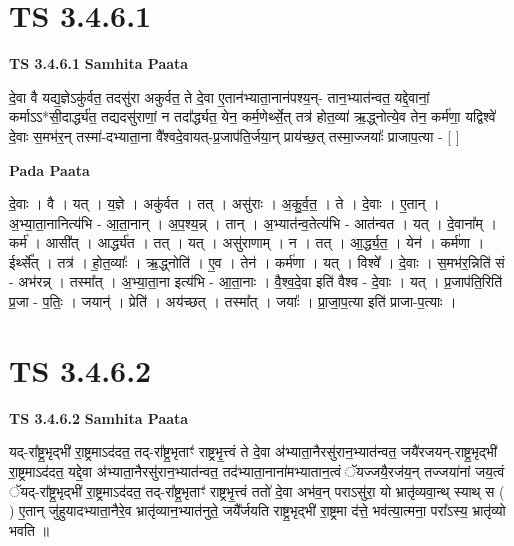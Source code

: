 \documentclass[17pt]{extarticle}
\begin{document}

\section{ TS 3.4.6.1 }

\textbf{TS 3.4.6.1 } \newline
\textbf{Samhita Paata} \newline

दे॒वा वै यद्य॒ज्ञेऽकु॑र्वत॒ तदसु॑रा अकुर्वत॒ ते दे॒वा ए॒तान॑भ्याता॒नान॑पश्य॒न्- तान॒भ्यात॑न्वत॒ यद्दे॒वानां॒ कर्माऽऽ*सी॒दार्द्ध्य॑त॒ तद्यदसु॑राणां॒ न तदा᳚र्द्ध्यत॒ येन॒ कर्म॒णेर्थ्से॒त् तत्र॑ होत॒व्या॑ ऋ॒द्ध्नोत्ये॒व तेन॒ कर्म॑णा॒ यद्विश्वे॑ दे॒वाः स॒मभ॑र॒न् तस्मा॑-दभ्याता॒ना वै᳚श्वदे॒वायत्-प्र॒जाप॑ति॒र्जया॒न् प्राय॑च्छ॒त् तस्मा॒ज्जयाः᳚ प्राजाप॒त्या - [  ] \newline

\textbf{Pada Paata} \newline

दे॒वाः । वै । यत् । य॒ज्ञे । अकु॑र्वत । तत् । असु॑राः । अ॒कु॒र्व॒त॒ । ते । दे॒वाः । ए॒तान् । अ॒भ्या॒ता॒नानित्य॑भि - आ॒ता॒नान् । अ॒प॒श्य॒न्न् । तान् । अ॒भ्यात॑न्व॒तेत्य॑भि - आत॑न्वत । यत् । दे॒वाना᳚म् । कर्म॑ । आसी᳚त् । आर्द्ध्य॑त । तत् । यत् । असु॑राणाम् । न । तत् । आ॒र्द्ध्य॒त॒ । येन॑ । कर्म॑णा । ईर्थ्से᳚त् । तत्र॑ । हो॒त॒व्याः᳚ । ऋ॒द्ध्नोति॑ । ए॒व । तेन॑ । कर्म॑णा । यत् । विश्वे᳚ । दे॒वाः । स॒मभ॑र॒न्निति॑ सं - अभ॑रन्न् । तस्मा᳚त् । अ॒भ्या॒ता॒ना इत्य॑भि - आ॒ता॒नाः । वै॒श्व॒दे॒वा इति॑ वैश्व - दे॒वाः । यत् । प्र॒जाप॑ति॒रिति॑ प्र॒जा - प॒तिः॒ । जयान्॑ । प्रेति॑ । अय॑च्छत् । तस्मा᳚त् । जयाः᳚ । प्रा॒जा॒प॒त्या इति॑ प्राजा-प॒त्याः ।  \newline





\section{ TS 3.4.6.2 }

\textbf{TS 3.4.6.2 } \newline
\textbf{Samhita Paata} \newline

यद्-रा᳚ष्ट्र॒भृद्भी॑ रा॒ष्ट्रमाऽद॑दत॒ तद्-रा᳚ष्ट्र॒भृताꣳ॑ राष्ट्रभृ॒त्त्वं ते दे॒वा अ॑भ्याता॒नैरसु॑रान॒भ्यात॑न्वत॒ जयै॑रजयन्-राष्ट्र॒भृद्भी॑ रा॒ष्ट्रमाऽद॑दत॒ यद्दे॒वा अ॑भ्याता॒नैरसु॑रान॒भ्यात॑न्वत॒ तद॑भ्याता॒नाना॑मभ्यातान॒त्वं ॅयज्जयै॒रज॑य॒न् तज्जया॑नां जय॒त्वं ॅयद्-रा᳚ष्ट्र॒भृद्भी॑ रा॒ष्ट्रमाऽद॑दत॒ तद्-रा᳚ष्ट्र॒भृताꣳ॑ राष्ट्रभृ॒त्त्वं ततो॑ दे॒वा अभ॑व॒न् पराऽसु॑रा॒ यो भ्रातृ॑व्यवा॒न्थ् स्याथ् स ( ) ए॒तान् जु॑हुयादभ्याता॒नैरे॒व भ्रातृ॑व्यान॒भ्यात॑नुते॒ जयै᳚र्जयति राष्ट्र॒भृद्भी॑ रा॒ष्ट्रमा द॑त्ते॒ भव॑त्या॒त्मना॒ परा᳚ऽस्य॒ भ्रातृ॑व्यो भवति ॥ \newline
\end{document}
